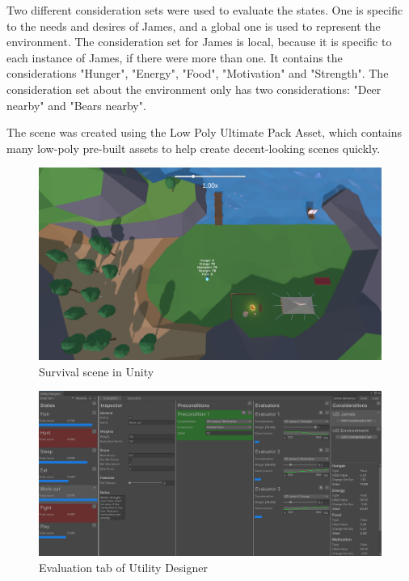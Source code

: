 Two different consideration sets were used to evaluate the states. One is specific to the needs and desires of James, and a global one is used to represent the environment. The consideration set for James is local, because it is specific to each instance of James, if there were more than one. It contains the considerations "Hunger", "Energy", "Food", "Motivation" and "Strength". The consideration set about the environment only has two considerations: "Deer nearby" and "Bears nearby".

The scene was created using the Low Poly Ultimate Pack Asset, which contains many low-poly pre-built assets to help create decent-looking scenes quickly.

\begin{figure}[H]
	\centering
		\includegraphics[scale=0.25]{images/utility_designer_survival.png}
	\caption{Survival scene in Unity}
	\label{fig:utility_designer_survival}
\end{figure}

\begin{figure}[H]
	\centering
		\includegraphics[scale=0.38]{images/utility_designer_survival_evaluation.png}
	\caption{Evaluation tab of Utility Designer}
	\label{fig:utility_designer_survival_evaluation}
\end{figure}

